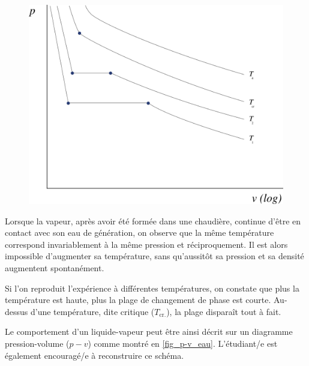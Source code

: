 		\begin{figure}
			\begin{center}
				\includegraphics[width=\didacticpvdiagramwidth]{images/pv_liquidevapeur_construction.png}
			\end{center}
			\label{fig_p-v_construction_1}
		\end{figure}

		Lorsque la vapeur, après avoir été formée dans une chaudière, continue d’être en contact avec son eau de génération, on observe que la même température correspond invariablement à la même pression et réciproquement. Il est alors impossible d’augmenter sa température, sans qu’aussitôt sa pression et sa densité augmentent spontanément.
		
		Si l’on reproduit l’expérience à différentes températures, on constate que plus la température est haute, plus la plage de changement de phase est courte. Au-dessus d’une température, dite critique ($T_\text{cr.}$), la plage disparaît tout à fait.

		Le comportement d’un liquide-vapeur peut être ainsi décrit sur un diagramme pression-volume ($p-v$) comme montré en \cref{fig_p-v_eau}. L’étudiant/e est également encouragé/e à reconstruire ce schéma.

